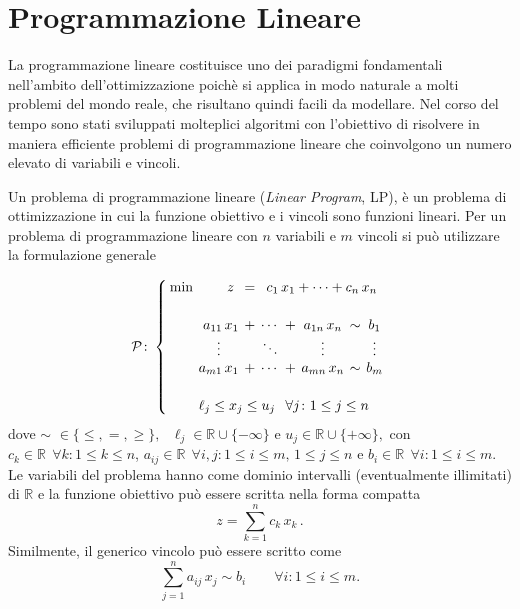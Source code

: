 \section{Programmazione Lineare}
La programmazione lineare costituisce uno dei paradigmi fondamentali nell'ambito dell'ottimizzazione poichè si applica
in modo naturale a molti problemi del mondo reale, che risultano quindi facili da modellare. Nel corso del tempo sono
stati sviluppati molteplici algoritmi con l'obiettivo di risolvere in maniera efficiente problemi di programmazione
lineare che coinvolgono un numero elevato di variabili e vincoli.

Un problema di programmazione lineare (\textit{Linear Program}, LP), è un problema di ottimizzazione in cui la funzione
obiettivo e i vincoli sono funzioni lineari. Per un problema di programmazione lineare con \( n \) variabili e \( m \)
vincoli si può utilizzare la formulazione generale

\begin{equation}
\mathcal{P}\colon
\setlength{\arraycolsep}{2pt}
\left\{\begin{array}{rrcccccc}
\min & z\,\, &=& \multicolumn{5}{c}{c_{1}\,x_{1}+\cdots+c_{n}\,x_{n}} \\[15pt]
     &  a_{11}\,x_{1} &+ &\cdots &+ &a_{1n}\,x_{n} &\sim &b_{1}       \\
     & \multicolumn{1}{c}{\vdots} &&\ddots&&\vdots&& \vdots           \\
     &  a_{m1}\,x_{1} &+ &\cdots &+ &a_{mn}\,x_{n} &\sim &b_{m}       \\[15pt]
     & \multicolumn{7}{l}{\ell_j \le x_{j} \le u_{j} \;\;\, \forall j\colon
     1 \le j \le n}
\end{array}\right.\\[10pt]
\end{equation}
dove
\(
\sim \,\,\in \{ \leq, =, \geq \}, \text{ } \ell_j \in \mathbb{R} \cup \{-\infty\} \text{ e } u_j \in \mathbb{R} \cup
\{+\infty\},
\)
con \( c_k \in \mathbb{R} \;\, \forall k\colon 1 \leq k \leq n \), \( a_{ij} \in \mathbb{R} \;\, \forall i,j\colon 1
\leq i \leq m,\, 1 \leq j \leq n \) e \( b_i \in \mathbb{R}\;\, \forall i\colon 1 \leq i \leq m \). Le variabili del
problema hanno come dominio intervalli (eventualmente illimitati) di \( \mathbb{R} \) e la funzione obiettivo può essere
scritta nella forma compatta
\begin{equation}
    z = \sum_{k = 1}^n c_k\,x_k\,.
\end{equation}
Similmente, il generico vincolo può essere scritto come
\begin{equation}
    \sum_{j = 1}^n a_{ij}\, x_j \sim b_i \qquad \forall i\colon 1 \leq i \leq m.
\end{equation}

